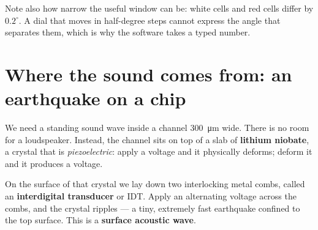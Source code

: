 \documentclass[11pt,a4paper]{article}
\begin{document}
Note also how narrow the useful window can be: white cells and red cells differ
by $0.2^\circ$. A dial that moves in half-degree steps cannot express the angle
that separates them, which is why the software takes a typed number.

\section{Where the sound comes from: an earthquake on a chip}

We need a standing sound wave inside a channel \SI{300}{\micro\meter} wide.
There is no room for a loudspeaker. Instead, the channel sits on top of a slab
of \textbf{lithium niobate}, a crystal that is \emph{piezoelectric}: apply a
voltage and it physically deforms; deform it and it produces a voltage.

On the surface of that crystal we lay down two interlocking metal combs, called
an \textbf{interdigital transducer} or IDT. Apply an alternating voltage across
the combs, and the crystal ripples --- a tiny, extremely fast earthquake
confined to the top surface. This is a \textbf{surface acoustic wave}.
\end{document}

